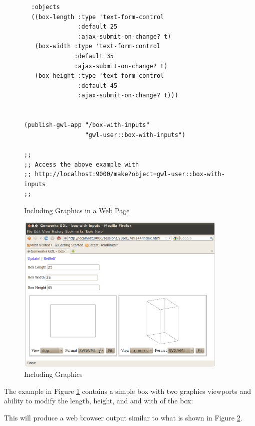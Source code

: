\documentclass [11pt]{book}
\begin{document}
\begin{figure}
\begin{lrbox}{\boxedverb}
\begin{minipage}{\linewidth}
{\begin{verbatim}
  :objects 
  ((box-length :type 'text-form-control
               :default 25
               :ajax-submit-on-change? t)
   (box-width :type 'text-form-control
              :default 35
              :ajax-submit-on-change? t)
   (box-height :type 'text-form-control
               :default 45
               :ajax-submit-on-change? t)))


(publish-gwl-app "/box-with-inputs" 
                 "gwl-user::box-with-inputs")

;;
;; Access the above example with 
;; http://localhost:9000/make?object=gwl-user::box-with-inputs
;;

\end{verbatim}}
\end{minipage}
\end{lrbox}
\fbox{\usebox{\boxedverb}}

\caption{Including Graphics in a Web Page}

\label{fig:gwl-5}

\end{figure}

\begin{figure}
\begin{center}
\includegraphics[width=4in,height=3in]{../images/gwl-5.png}
\end{center}

\caption{Including Graphics}

\label{fig:gwl-5-image}

\end{figure}


The example in Figure 
\ref{fig:gwl-5} contains a simple box with two graphics viewports
and ability to modify the length, height, and and with of the box:



This will produce a web browser output similar to what is shown in Figure 
\ref{fig:gwl-5-image}.
\end{document}
